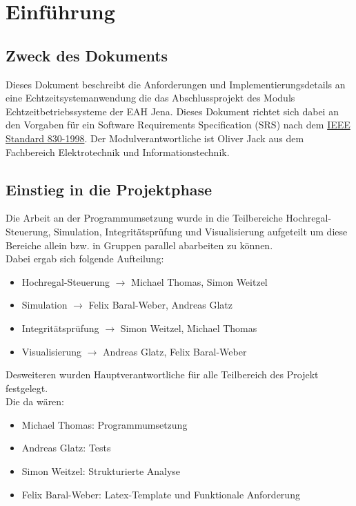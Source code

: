 \section{Einführung}
\subsection{Zweck des Dokuments}
Dieses Dokument beschreibt die Anforderungen und Implementierungsdetails an eine Echtzeitsystemanwendung die das Abschlussprojekt des Moduls Echtzeitbetriebssysteme der EAH Jena. Dieses Dokument richtet sich dabei an den Vorgaben für ein Software Requirements Specification (SRS) nach dem \href{https://de.wikipedia.org/wiki/Software_Requirements_Specification}{IEEE Standard 830-1998}. Der Modulverantwortliche ist Oliver Jack aus dem Fachbereich Elektrotechnik und Informationstechnik.\\

\subsection{Einstieg in die Projektphase}
Die Arbeit an der Programmumsetzung wurde in die Teilbereiche Hochregal-Steuerung, Simulation, Integritätsprüfung und Visualisierung aufgeteilt um diese Bereiche allein bzw. in Gruppen parallel  abarbeiten zu können.\\
Dabei ergab sich folgende Aufteilung:
\begin{itemize} 
	\item Hochregal-Steuerung $\rightarrow$ Michael Thomas, Simon Weitzel
	\item Simulation $\rightarrow$ Felix Baral-Weber, Andreas Glatz
	\item Integritätsprüfung $\rightarrow$ Simon Weitzel, Michael Thomas
	\item Visualisierung $\rightarrow$ Andreas Glatz, Felix Baral-Weber
\end{itemize}

Desweiteren wurden Hauptverantwortliche für alle Teilbereich des Projekt festgelegt.\\

Die da wären:\\
\begin{itemize} 
	\item Michael Thomas: Programmumsetzung
	\item Andreas Glatz: Tests
	\item Simon Weitzel: Strukturierte Analyse
	\item Felix Baral-Weber: Latex-Template und Funktionale Anforderung
\end{itemize}